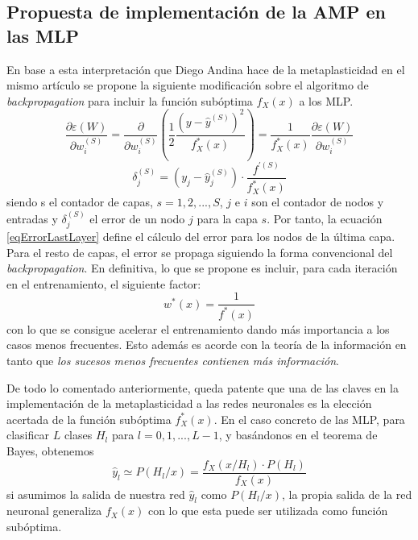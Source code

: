 \documentclass[10pt,a4paper]{report}
\begin{document}
\subsection{Propuesta de implementación de la AMP en las MLP}
En base a esta interpretación que Diego Andina hace de la metaplasticidad en el mismo artículo \citep{Andina2009} se propone la siguiente modificación sobre el algoritmo de \textit{backpropagation} para incluir la función subóptima $f_X(x)$ a los MLP. 
\begin{equation}
	\dfrac{\partial\varepsilon(W)}{\partial w^{(S)}_i} = \dfrac{\partial}{\partial w^{(S)}_i}\left(\dfrac{1}{2}\dfrac{(y-\widehat{y}^{(S)})^2}{f^*_X(x)}\right) = \dfrac{1}{f^*_X(x)}\dfrac{\partial\varepsilon(W)}{\partial w^{(S)}_i}
\end{equation} 
\begin{equation}
	\label{eqErrorLastLayer}
	\delta_j^{(S)} = (y_j - \widehat{y}^{(S)}_j) \cdot \dfrac{f^{'(S)}}{f^*_X(x)}
\end{equation}
siendo s el contador de capas, $s=1,2,...,S$, $j$ e $i$ son el contador de nodos y entradas y $\delta_j^{(S)}$ el error de un nodo $j$ para la capa $s$. Por tanto, la ecuación \ref{eqErrorLastLayer} define el cálculo del error para los nodos de la última capa. Para el resto de capas, el error se propaga siguiendo la forma convencional del \textit{backpropagation}.
En definitiva, lo que se propone es incluir, para cada iteración en el entrenamiento, el siguiente factor:
\begin{equation}
	w^*(x) = \dfrac{1}{f^*(x)}
\end{equation}
con lo que se consigue acelerar el entrenamiento dando más importancia a los casos menos frecuentes. Esto además es acorde con la teoría de la información en tanto que \textit{los sucesos menos frecuentes contienen más información}.

De todo lo comentado anteriormente, queda patente que una de las claves en la implementación de la metaplasticidad a las redes neuronales es la elección acertada de la función subóptima $f^*_X(x)$. En el caso concreto de las MLP, para clasificar $L$ clases $H_l$ para $l=0,1,...,L-1$, y basándonos en el teorema de Bayes, obtenemos
\begin{equation}
	\widehat{y}_l \simeq P(H_l/x)=\dfrac{f_X(x/H_l) \cdot P(H_l)}{f_X(x)}
\end{equation}
si asumimos la salida de nuestra red $\widehat{y}_l$ como $P(H_l/x)$, la propia salida de la red neuronal generaliza $f_X(x)$ con lo que esta puede ser utilizada como función subóptima.
\end{document}
